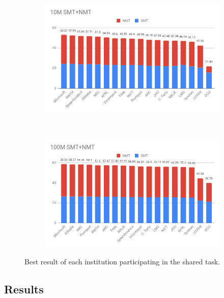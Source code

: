 \begin{figure}
  \centering
  \begin{subfigure}[b]{0.5\textwidth}
    \includegraphics[width=\textwidth]{images/10M.png}
  \end{subfigure}
  ~
  \begin{subfigure}[b]{0.5\textwidth}
    \includegraphics[width=\textwidth]{images/100M.png}
  \end{subfigure}
  \caption{Best result of each institution participating in the shared task.}
  \label{fig:results}
\end{figure}

\subsection{Results}

